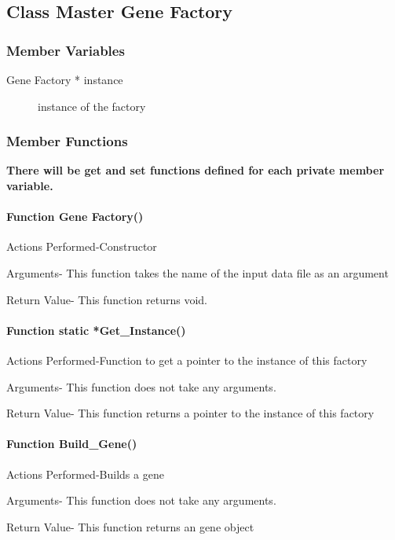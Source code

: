 \documentclass{article}
\begin{document}
\newpage
\subsection{Class Master Gene Factory}
\subsubsection{Member Variables}
\begin{description}
\item[Gene Factory * instance] instance of the factory
\end{description}
\subsubsection{Member Functions}
\textbf{There will be get and set functions defined for each private member variable.}

\paragraph{Function Gene Factory()}
Actions Performed-Constructor
                 
Arguments- This function takes the name of the input data file as an argument
                    
Return Value-  This function returns void.

\paragraph{Function static *Get\_Instance()}
Actions Performed-Function to get a pointer to the instance of this factory
                 
Arguments- This function does not take any arguments.
                    
Return Value- This function returns a pointer to the instance of this factory

\paragraph{Function Build\_Gene()}
Actions Performed-Builds a gene
                 
Arguments- This function does not take any arguments.
                    
Return Value- This function returns an gene object


\end{document}
